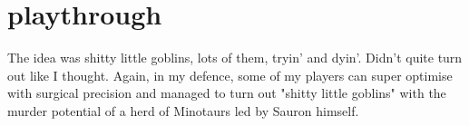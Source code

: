 %
%










































\clearpage
\raggedbottom
\section*{playthrough}
\label{playthrough}

\begin{readoutloud}
The idea was shitty little goblins, lots of them, tryin' and dyin'. Didn't quite turn out like I thought. Again, in my defence, some of my players can super optimise with surgical precision and managed to turn out "shitty little goblins" with the murder potential of a herd of Minotaurs led by Sauron himself.
\end{readoutloud}

